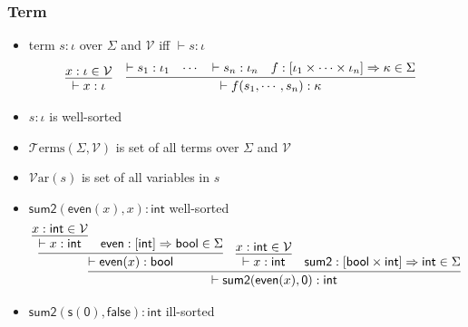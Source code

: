 \documentclass[12pt,aspectratio=169]{beamer}
\newcommand{\m}[1]{\mathsf{#1}}
\newcommand{\VV}{\mathcal{V}}
\newcommand{\TT}{\mathcal{T}}
\newcommand{\Var}{\mathcal{V}\mathrm{ar}}
\newcommand{\Terms}{\TT\mathrm{erms}}
\begin{document}
\begin{frame}
    \frametitle{Term}
    \begin{definition}[term]
        \begin{itemize}
        \item \alert{term} $s : \iota$ over $\Sigma$ and $\VV$ iff
        $\vdash s : \iota$ \pause
        \begin{align*}
            \infer{\vdash x : \iota}{x : \iota \in \VV} \;\;\;\;
                & \infer{\vdash f(s_1,\cdots, s_n) : \kappa}
                    {\vdash s_1 : \iota_1 & \cdots & \vdash s_n : \iota_n
                    & f:[\iota_1 \times \cdots \times \iota_n]
                    \Rightarrow \kappa \in \Sigma}
        \end{align*}
        \pause
        \item $s : \iota$ is \alert{well-sorted}
        \pause
        \item \alert{$\Terms(\Sigma, \VV)$} is set of all terms over $\Sigma$ and $\VV$
        \pause
        \item \alert{$\Var(s)$} is set of all variables in $s$
        \end{itemize}
    \end{definition}
\end{frame}


\begin{frame}
    \begin{example}
        \begin{itemize}
            \item $\m{sum2}(\m{even}(x), x) : \m{int}$ \pause \quad \alert{well-sorted}
            \pause
        {\small
            \begin{align*}
                \infer{\vdash \m{sum2}(\m{even}(x), \m{0}) : \m{int}}
                {\infer{\vdash \m{even}(x) : \m{bool}}
                    {\infer{\vdash x : \m{int}}{x : \m{int} \in \VV} & \m{even} : [\m{int}] \Rightarrow \m{bool} \in \Sigma}
                & \infer{\vdash x : \m{int}}{x : \m{int} \in \VV}
                & \m{sum2} : [\m{bool} \times \m{int}] \Rightarrow \m{int} \in \Sigma
                }
            \end{align*}
        }
        \pause
    \item $\m{sum2}(\m{s}(\m{0}), \m{false}) : \m{int}$ \pause \quad \alert{ill-sorted}
        \end{itemize}
    \end{example}
\end{frame}
\end{document}
